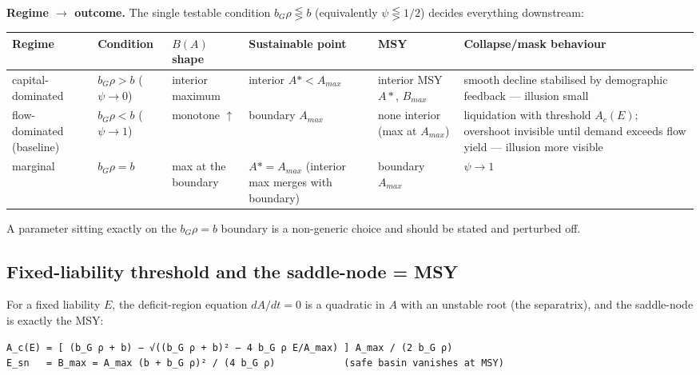 \documentclass[11pt]{article}
\begin{document}
\textbf{Regime \ensuremath{\to{}} outcome.} The single testable condition $b_{G} \rho{} \lesseqgtr{} b$ (equivalently $\psi{} \lesseqgtr{} 1/2$) decides everything downstream:

\begin{table}[htbp]
\centering
\small
\begin{tabularx}{\textwidth}{>{\raggedright\arraybackslash}X>{\raggedright\arraybackslash}X>{\raggedright\arraybackslash}X>{\raggedright\arraybackslash}X>{\raggedright\arraybackslash}X>{\raggedright\arraybackslash}X}
\toprule
Regime & Condition & $B(A)$ shape & Sustainable point & MSY & Collapse/mask behaviour \\
\midrule
capital-dominated & $b_{G} \rho{} > b$ ($\psi{} \to{} 0$) & interior maximum & interior $A* < A_{max}$ & interior MSY $A*$, $B_{max}$ & smooth decline stabilised by demographic feedback — illusion small \\
flow-dominated (baseline) & $b_{G} \rho{} < b$ ($\psi{} \to{} 1$) & monotone \ensuremath{\uparrow{}} & boundary $A_{max}$ & none interior (max at $A_{max}$) & liquidation with threshold $A_{c}(E)$; overshoot invisible until demand exceeds flow yield — illusion more visible \\
marginal & $b_{G} \rho{} = b$ & max at the boundary & $A* = A_{max}$ (interior max merges with boundary) & boundary $A_{max}$ & $\psi{} \to{} 1$ \\
\bottomrule
\end{tabularx}
\end{table}

A parameter sitting exactly on the $b_{G} \rho{} = b$ boundary is a non-generic choice and should be stated and perturbed off.

\subsection{Fixed-liability threshold and the saddle-node = MSY}

For a fixed liability $E$, the deficit-region equation $dA/dt = 0$ is a quadratic in $A$ with an unstable root (the separatrix), and the saddle-node is exactly the MSY:

\begingroup\small\begin{verbatim}
A_c(E) = [ (b_G ρ + b) − √((b_G ρ + b)² − 4 b_G ρ E/A_max) ] A_max / (2 b_G ρ)
E_sn   = B_max = A_max (b + b_G ρ)² / (4 b_G ρ)            (safe basin vanishes at MSY)
\end{verbatim}\endgroup
\end{document}
